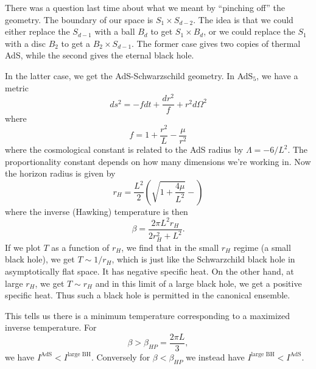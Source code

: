There was a question last time about what we meant by ``pinching off'' the geometry. The boundary of our space is $S_1\times S_{d-2}$. The idea is that we could either replace the $S_{d-1}$ with a ball $B_d$ to get $S_1\times B_d$, or we could replace the $S_1$ with a disc $B_2$ to get a $B_2\times S_{d-1}$. The former case gives two copies of thermal AdS, while the second gives the eternal black hole.

In the latter case, we get the AdS-Schwarzschild geometry. In AdS${}_5$, we have a metric
\begin{equation}
    ds^2 = -f dt + \frac{dr^2}{f} + r^2 d\Omega^2
\end{equation}
where
\begin{equation}
    f=1+\frac{r^2}{L}-\frac{\mu}{r^2}
\end{equation}
where the cosmological constant is related to the AdS radius by $\Lambda=-6/L^2$. The proportionality constant depends on how many dimensions we're working in. Now the horizon radius is given by
\begin{equation}
    r_H=\frac{L^2}{2}(\sqrt{1+\frac{4\mu}{L^2}}-)
\end{equation}
where the inverse (Hawking) temperature is then
\begin{equation}
    \beta = \frac{2\pi L^2 r_H}{2r_H^2+L^2}.
\end{equation}
If we plot $T$ as a function of $r_H$, we find that in the small $r_H$ regime (a small black hole), we get $T\sim 1/r_H$, which is just like the Schwarzchild black hole in asymptotically flat space. It has negative specific heat. On the other hand, at large $r_H$, we get $T\sim r_H$ and in this limit of a large black hole, we get a positive specific heat. Thus such a black hole is permitted in the canonical ensemble.

This tells us there is a minimum temperature corresponding to a maximized inverse temperature. For
\begin{equation}
    \beta > \beta_{HP} = \frac{2\pi L}{3},
\end{equation}
we have $I^\text{AdS} < I^\text{large BH}$. Conversely for $\beta < \beta_{HP}$ we instead have $I^\text{large BH} < I^\text{AdS}$.

